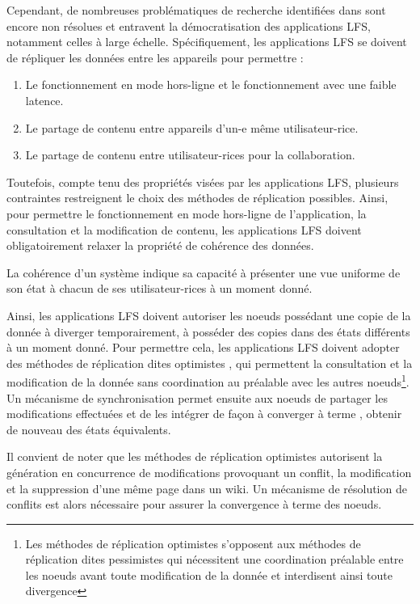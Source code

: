 Cependant, de nombreuses problématiques de recherche identifiées dans \cite{localfirstsoftware2019} sont encore non résolues et entravent la démocratisation des applications \ac{LFS}, notamment celles à large échelle.
Spécifiquement, les applications \ac{LFS} se doivent de répliquer les données entre les appareils pour permettre :
\begin{enumerate}
  \item Le fonctionnement en mode hors-ligne et le fonctionnement avec une faible latence.
  \item Le partage de contenu entre appareils d'un-e même utilisateur-rice.
  \item Le partage de contenu entre utilisateur-rices pour la collaboration.
\end{enumerate}

Toutefois, compte tenu des propriétés visées par les applications \ac{LFS}, plusieurs contraintes restreignent le choix des méthodes de réplication possibles.
Ainsi, pour permettre le fonctionnement en mode hors-ligne de l'application, \ie la consultation et la modification de contenu, les applications \ac{LFS} doivent obligatoirement relaxer la propriété de cohérence des données.
\begin{definition}[Cohérence]
  La cohérence d'un système indique sa capacité à présenter une vue uniforme de son état à chacun de ses utilisateur-rices à un moment donné.
\end{definition}

Ainsi, les applications \ac{LFS} doivent autoriser les noeuds possédant une copie de la donnée à diverger temporairement, \ie à posséder des copies dans des états différents à un moment donné.
Pour permettre cela, les applications \ac{LFS} doivent adopter des méthodes de réplication dites optimistes \cite{2005-optimistic-replication-saito}, \ie qui permettent la consultation et la modification de la donnée sans coordination au préalable avec les autres noeuds\footnote{Les méthodes de réplication optimistes s'opposent aux méthodes de réplication dites pessimistes qui nécessitent une coordination préalable entre les noeuds avant toute modification de la donnée et interdisent ainsi toute divergence}.
Un mécanisme de synchronisation permet ensuite aux noeuds de partager les modifications effectuées et de les intégrer de façon à converger à terme \cite{10.1145/224057.224070}, \ie obtenir de nouveau des états équivalents.

Il convient de noter que les méthodes de réplication optimistes autorisent la génération en concurrence de modifications provoquant un conflit, \eg la modification et la suppression d'une même page dans un wiki.
Un mécanisme de résolution de conflits est alors nécessaire pour assurer la convergence à terme des noeuds.

